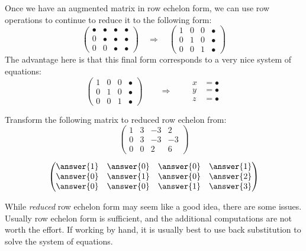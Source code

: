 \documentclass{ximera}
\begin{document}
Once we have an augmented matrix in row echelon form, we can use row
operations to continue to reduce it to the following form:
\[
\begin{pmatrix}
  \bullet & \bullet & \bullet & \bullet \\
     0   & \bullet & \bullet & \bullet \\
     0  &    0 & \bullet & \bullet
\end{pmatrix}
\quad
\Rightarrow
\quad
\begin{pmatrix}
  1 & 0 & 0  & \bullet \\
     0   & 1  &  0 & \bullet \\
     0  &    0 & 1 & \bullet
\end{pmatrix}
\]
The advantage here is that this final form corresponds to a very nice system of equations:
\[
\left(\begin{array}{ccc|c}
  1 &   0 & 0 & \bullet  \\
  0 &   1 & 0 & \bullet \\
   0& 0  &  1 & \bullet
\end{array}\right)
\qquad\Longrightarrow\qquad
\begin{aligned}
      x &= \bullet  \\
      y &= \bullet  \\
      z &=\bullet
\end{aligned}
\]
\begin{question}
  Transform the following matrix to reduced row echelon from:
  \[
  \begin{pmatrix}
  1 & 3 & -3 & 2  \\
  0 & 3 & -3 & -3 \\
  0 & 0 &  2 & 6
  \end{pmatrix}
  \]
  \begin{prompt}
    \[
    \begin{pmatrix}
      \answer{1} & \answer{0} & \answer{0} & \answer{1} \\
      \answer{0} & \answer{1} & \answer{0} & \answer{2} \\
      \answer{0} & \answer{0} & \answer{1} & \answer{3}
    \end{pmatrix}
    \]
  \end{prompt}
\end{question}
While \textit{reduced} row echelon form may seem like a good idea,
there are some issues.  Usually row echelon form is sufficient, and
the additional computations are not worth the effort.  If working by
hand, it is usually best to use back substitution to solve the system of equations.
\end{document}

